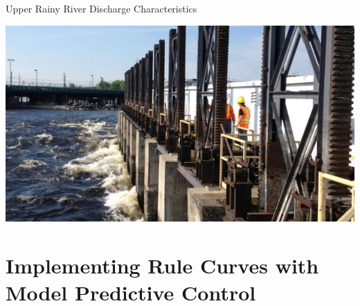 \documentclass[compress,english]{beamer}
\begin{document}
\begin{frame}{Upper Rainy River Discharge Characteristics}

\begin{center}
\end{center}

\end{frame} 


{\usebackgroundtemplate%
	{\includegraphics[height=\paperheight]{fort-frances-dam.jpg}}
\section{Implementing Rule Curves with Model Predictive Control}
}
\end{document}
